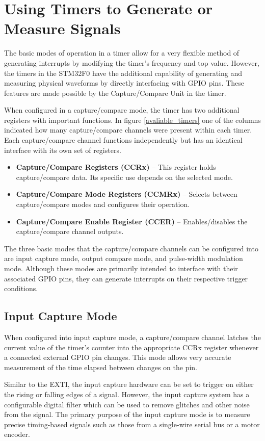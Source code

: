\documentclass[openany,11pt,fleqn]{book} %
\begin{document}
\section{Using Timers to Generate or Measure Signals}
The basic modes of operation in a timer allow for a very flexible method of generating interrupts by modifying the timer's frequency and top value. However, the timers in the STM32F0 have the additional capability of generating and measuring physical waveforms by directly interfacing with GPIO pins. These features are made possible by the Capture/Compare Unit in the timer. 

When configured in a capture/compare mode, the timer has two additional registers with important functions.  In figure \ref{avaliable_timers} one of the columns indicated how many capture/compare channels were present within each timer. Each capture/compare channel functions independently but has an identical interface with its own set of registers.  
\begin{itemize}
    \item \textbf{Capture/Compare Registers (CCRx)} -- This register holds capture/compare data. Its specific use depends on the selected mode.
    \item \textbf{Capture/Compare Mode Registers (CCMRx)} -- Selects between capture/compare modes and configures their operation.
    \item \textbf{Capture/Compare Enable Register (CCER)} -- Enables/disables the capture/compare channel outputs.
\end{itemize}

The three basic modes that the capture/compare channels can be configured into are input capture mode, output compare mode, and pulse-width modulation mode. Although these modes are primarily intended to interface with their associated GPIO pins, they can generate interrupts on their respective trigger conditions. 			
    
    \subsection{Input Capture Mode}
    When configured into input capture mode, a capture/compare channel latches the current value of the timer's counter into the appropriate CCRx register whenever a connected external GPIO pin changes. This mode allows very accurate measurement of the time elapsed between changes on the pin. 
    
    Similar to the EXTI, the input capture hardware can be set to trigger on either the rising or falling edges of a signal. However, the input capture system has a configurable digital filter which can be used to remove glitches and other noise from the signal. The primary purpose of the input capture mode is to measure precise timing-based signals such as those from a single-wire serial bus or a motor encoder.  
\end{document}
